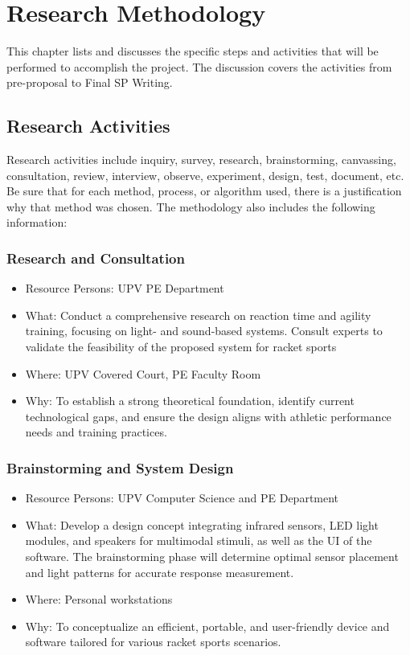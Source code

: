\chapter{Research Methodology}
This chapter lists and discusses the specific steps and activities that will be performed  to accomplish the project. 
The discussion covers the activities from pre-proposal to Final SP Writing.

\section{Research Activities}
Research activities include inquiry, survey, research, brainstorming, canvassing, consultation, review, interview, observe, experiment, design, test, document, etc.  
Be sure that for each method, process, or algorithm used, there is a justification why that method was chosen.
The methodology also includes the following information:

\subsection{Research and Consultation}
\begin{itemize}
   \item Resource Persons: UPV PE Department
   \item What: Conduct a comprehensive research on reaction time and agility training, focusing on light- and sound-based systems. Consult experts to validate the feasibility of the proposed system for racket sports
   \item Where: UPV Covered Court, PE Faculty Room
   \item Why: To establish a strong theoretical foundation, identify current technological gaps, and ensure the design aligns with athletic performance needs and training practices.
\end{itemize}

\subsection{Brainstorming and System Design}
\begin{itemize}
	\item Resource Persons: UPV Computer Science and PE Department
	\item What: Develop a design concept integrating infrared sensors, LED light modules, and speakers for multimodal stimuli, as well as the UI of the software. The brainstorming phase will determine optimal sensor placement and light patterns for accurate response measurement.
	\item Where: Personal workstations
	\item Why: To conceptualize an efficient, portable, and user-friendly device and software tailored for various racket sports scenarios.
\end{itemize}

